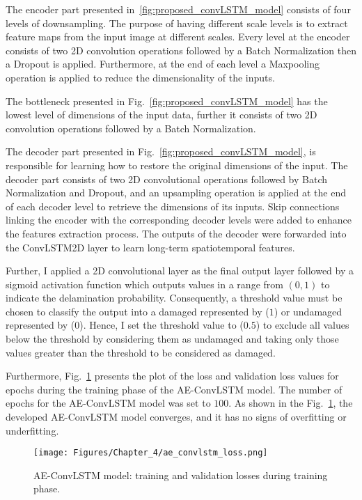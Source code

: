 The encoder part presented in~\ref{fig:proposed_convLSTM_model} consists of four levels of downsampling. 
The purpose of having different scale levels is to extract feature maps from the input image at different scales.
Every level at the encoder consists of two 2D convolution operations followed by a Batch Normalization then a Dropout is applied. 
Furthermore, at the end of each level a Maxpooling operation is applied to reduce the dimensionality of the inputs. 

The bottleneck presented in Fig.~\ref{fig:proposed_convLSTM_model} has the lowest level of dimensions of the input data, further it consists of two 2D convolution operations followed by a Batch Normaliza\-tion.

The decoder part presented in Fig.~\ref{fig:proposed_convLSTM_model}, is responsible for learning how to restore the original dimensions of the input.
The decoder part consists of two 2D convolutional operations followed by Batch Normalization and Dropout, and an upsampling operation is applied at the end of each decoder level to retrieve the dimensions of its inputs.
Skip connections linking the encoder with the corresponding decoder levels were added to enhance the features extraction process.
The outputs of the decoder were forwarded into the ConvLSTM2D layer to learn long-term spatiotemporal features.

Further, I applied a 2D convolutional layer as the final output layer followed by a sigmoid activation function which outputs values in a range from \((0,1)\) to indicate the delamination probability.
Consequently, a threshold value must be chosen to classify the output into a damaged represented by (\(1\)) or undamaged represented by (\(0\)).
Hence, I set the threshold value to (\(0.5\)) to exclude all values below the threshold by considering them as undamaged and taking only those values greater than the threshold to be considered as damaged.

Furthermore, Fig.~\ref{fig:ae_convlstm_loss} presents the plot of the loss and validation loss values for epochs during the training phase of the AE-ConvLSTM model.
The number of epochs for the AE-ConvLSTM model was set to $100$.
As shown in the Fig.~\ref{fig:ae_convlstm_loss}, the developed AE-ConvLSTM model converges, and it has no signs of overfitting or underfitting.
\begin{figure}[!h]
	\centering
	\texttt{[image: Figures/Chapter\_4/ae\_convlstm\_loss.png]}
	\caption{AE-ConvLSTM model: training and validation losses during training phase.}
	\label{fig:ae_convlstm_loss}
\end{figure}


\clearpage